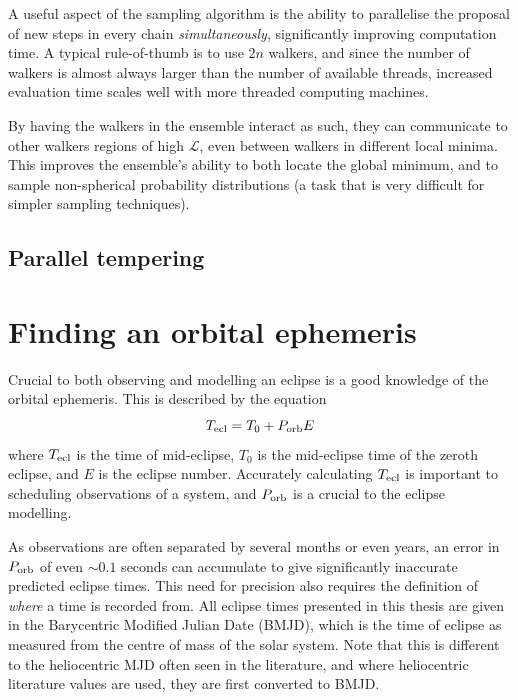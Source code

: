 A useful aspect of the sampling algorithm is the ability to parallelise the proposal of new steps in every chain \textit{simultaneously}, significantly improving computation time.
A typical rule-of-thumb is to use $2n$ walkers, and since the number of walkers is almost always larger than the number of available threads, increased evaluation time scales well with more threaded computing machines.

By having the walkers in the ensemble interact as such, they can communicate to other walkers regions of high $\mathcal{L}$, even between walkers in different local minima. This improves the ensemble's ability to both locate the global minimum, and to sample non-spherical probability distributions (a task that is very difficult for simpler sampling techniques).


\subsection{Parallel tempering}
\label{sect:modelling:parallel tempering}


\section{Finding an orbital ephemeris}
\label{sect:modelling:getting ephemeris}

Crucial to both observing and modelling an eclipse is a good knowledge of the orbital ephemeris. This is described by the equation
\begin{equation}
    \label{eqn:modelling:general ephemeris equation}
    T_{\rm ecl} = T_0 + P_{\rm orb} E
\end{equation}
where $T_{\rm ecl}$ is the time of mid-eclipse, $T_0$ is the mid-eclipse time of the zeroth eclipse, and $E$ is the eclipse number. Accurately calculating $T_{\rm ecl}$ is important to scheduling observations of a system, and $P_{\rm orb}$ is a crucial to the eclipse modelling.

As observations are often separated by several months or even years, an error in $P_{\rm orb}$ of even $\sim 0.1$ seconds can accumulate to give significantly inaccurate predicted eclipse times. This need for precision also requires the definition of {\it where} a time is recorded from. All eclipse times presented in this thesis are given in the Barycentric Modified Julian Date (BMJD), which is the time of eclipse as measured from the centre of mass of the solar system. Note that this is different to the heliocentric MJD often seen in the literature, and where heliocentric literature values are used, they are first converted to BMJD.

